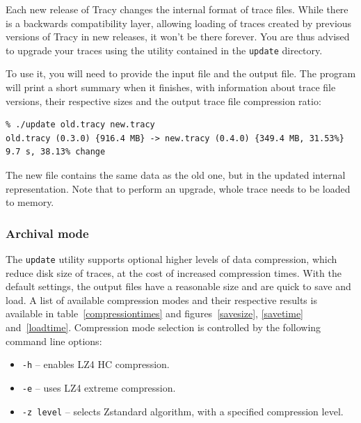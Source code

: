 \documentclass[hidelinks,titlepage,a4paper]{article}
\begin{document}
Each new release of Tracy changes the internal format of trace files. While there is a backwards compatibility layer, allowing loading of traces created by previous versions of Tracy in new releases, it won't be there forever. You are thus advised to upgrade your traces using the utility contained in the \texttt{update} directory.

To use it, you will need to provide the input file and the output file. The program will print a short summary when it finishes, with information about trace file versions, their respective sizes and the output trace file compression ratio:

\begin{verbatim}
% ./update old.tracy new.tracy
old.tracy (0.3.0) {916.4 MB} -> new.tracy (0.4.0) {349.4 MB, 31.53%}  9.7 s, 38.13% change
\end{verbatim}

The new file contains the same data as the old one, but in the updated internal representation. Note that to perform an upgrade, whole trace needs to be loaded to memory.

\subsubsection{Archival mode}
\label{archival}

The \texttt{update} utility supports optional higher levels of data compression, which reduce disk size of traces, at the cost of increased compression times. With the default settings, the output files have a reasonable size and are quick to save and load. A list of available compression modes and their respective results is available in table~\ref{compressiontimes} and figures~\ref{savesize}, \ref{savetime} and~\ref{loadtime}. Compression mode selection is controlled by the following command line options:

\begin{itemize}
\item \texttt{-h} -- enables LZ4 HC compression.
\item \texttt{-e} -- uses LZ4 extreme compression.
\item \texttt{-z level} -- selects Zstandard algorithm, with a specified compression level.
\end{itemize}
\end{document}
